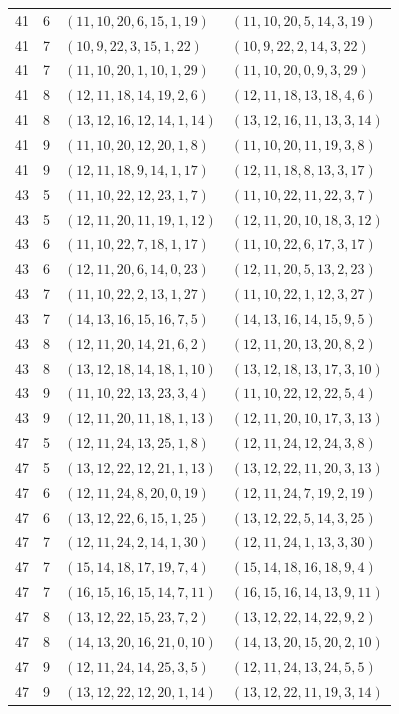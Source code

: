 \begin{longtable}{rrll}
41&6&$(11,10,20,6,15,1,19)$&$(11,10,20,5,14,3,19)$\\
41&7&$(10,9,22,3,15,1,22)$&$(10,9,22,2,14,3,22)$\\
41&7&$(11,10,20,1,10,1,29)$&$(11,10,20,0,9,3,29)$\\
41&8&$(12,11,18,14,19,2,6)$&$(12,11,18,13,18,4,6)$\\
41&8&$(13,12,16,12,14,1,14)$&$(13,12,16,11,13,3,14)$\\
41&9&$(11,10,20,12,20,1,8)$&$(11,10,20,11,19,3,8)$\\
41&9&$(12,11,18,9,14,1,17)$&$(12,11,18,8,13,3,17)$\\
43&5&$(11,10,22,12,23,1,7)$&$(11,10,22,11,22,3,7)$\\
43&5&$(12,11,20,11,19,1,12)$&$(12,11,20,10,18,3,12)$\\
43&6&$(11,10,22,7,18,1,17)$&$(11,10,22,6,17,3,17)$\\
43&6&$(12,11,20,6,14,0,23)$&$(12,11,20,5,13,2,23)$\\
43&7&$(11,10,22,2,13,1,27)$&$(11,10,22,1,12,3,27)$\\
43&7&$(14,13,16,15,16,7,5)$&$(14,13,16,14,15,9,5)$\\
43&8&$(12,11,20,14,21,6,2)$&$(12,11,20,13,20,8,2)$\\
43&8&$(13,12,18,14,18,1,10)$&$(13,12,18,13,17,3,10)$\\
43&9&$(11,10,22,13,23,3,4)$&$(11,10,22,12,22,5,4)$\\
43&9&$(12,11,20,11,18,1,13)$&$(12,11,20,10,17,3,13)$\\
47&5&$(12,11,24,13,25,1,8)$&$(12,11,24,12,24,3,8)$\\
47&5&$(13,12,22,12,21,1,13)$&$(13,12,22,11,20,3,13)$\\
47&6&$(12,11,24,8,20,0,19)$&$(12,11,24,7,19,2,19)$\\
47&6&$(13,12,22,6,15,1,25)$&$(13,12,22,5,14,3,25)$\\
47&7&$(12,11,24,2,14,1,30)$&$(12,11,24,1,13,3,30)$\\
47&7&$(15,14,18,17,19,7,4)$&$(15,14,18,16,18,9,4)$\\
47&7&$(16,15,16,15,14,7,11)$&$(16,15,16,14,13,9,11)$\\
47&8&$(13,12,22,15,23,7,2)$&$(13,12,22,14,22,9,2)$\\
47&8&$(14,13,20,16,21,0,10)$&$(14,13,20,15,20,2,10)$\\
47&9&$(12,11,24,14,25,3,5)$&$(12,11,24,13,24,5,5)$\\
47&9&$(13,12,22,12,20,1,14)$&$(13,12,22,11,19,3,14)$\\

\end{longtable}
